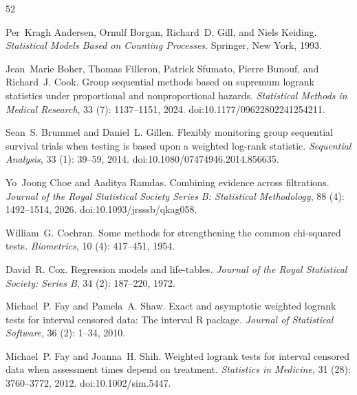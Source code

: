 \documentclass[12pt]{article}
\theoremstyle{definition}
\theoremstyle{remark}
\begin{document}
\renewcommand{\refname}{References}
\begin{thebibliography}{52}

Per~Kragh Andersen, Ornulf Borgan, Richard~D. Gill, and Niels Keiding.
\newblock \emph{Statistical Models Based on Counting Processes}.
\newblock Springer, New York, 1993.

Jean~Marie Boher, Thomas Filleron, Patrick Sfumato, Pierre Bunouf, and Richard~J. Cook.
\newblock Group sequential methods based on supremum logrank statistics under proportional and nonproportional hazards.
\newblock \emph{Statistical Methods in Medical Research}, 33 (7): 1137--1151, 2024.
\newblock doi:10.1177/09622802241254211.

Sean~S. Brummel and Daniel~L. Gillen.
\newblock Flexibly monitoring group sequential survival trials when testing is based upon a weighted log-rank statistic.
\newblock \emph{Sequential Analysis}, 33 (1): 39--59, 2014.
\newblock doi:10.1080/07474946.2014.856635.

Yo~Joong Choe and Aaditya Ramdas.
\newblock Combining evidence across filtrations.
\newblock \emph{Journal of the Royal Statistical Society Series B: Statistical Methodology}, 88 (4): 1492--1514, 2026.
\newblock doi:10.1093/jrsssb/qkag058.

William~G. Cochran.
\newblock Some methods for strengthening the common chi-squared tests.
\newblock \emph{Biometrics}, 10 (4): 417--451, 1954.

David~R. Cox.
\newblock Regression models and life-tables.
\newblock \emph{Journal of the Royal Statistical Society: Series B},
  34 (2): 187--220, 1972.

Michael~P. Fay and Pamela~A. Shaw.
\newblock Exact and asymptotic weighted logrank tests for interval censored
  data: The interval {R} package.
\newblock \emph{Journal of Statistical Software}, 36 (2):
  1--34, 2010.

Michael~P. Fay and Joanna~H. Shih.
\newblock Weighted logrank tests for interval censored data when assessment
  times depend on treatment.
\newblock \emph{Statistics in Medicine}, 31 (28):
  3760--3772, 2012.
\newblock doi:10.1002/sim.5447.


\end{thebibliography}
\end{document}
